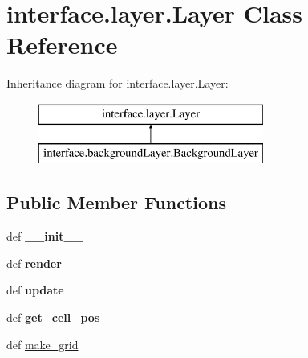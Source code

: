 \hypertarget{classinterface_1_1layer_1_1_layer}{\section{interface.\-layer.\-Layer \-Class \-Reference}
\label{classinterface_1_1layer_1_1_layer}
}
\-Inheritance diagram for interface.\-layer.\-Layer\-:\begin{figure}[H]
\begin{center}
\leavevmode
\includegraphics[height=2.000000cm]{classinterface_1_1layer_1_1_layer}
\end{center}
\end{figure}
\subsection*{\-Public \-Member \-Functions}
\begin{DoxyCompactItemize}
\item 
\hypertarget{classinterface_1_1layer_1_1_layer_ab9b02ee5672b0222065ac7d8148b6c9c}{def {\bfseries \-\_\-\-\_\-init\-\_\-\-\_\-}}\label{classinterface_1_1layer_1_1_layer_ab9b02ee5672b0222065ac7d8148b6c9c}

\item 
\hypertarget{classinterface_1_1layer_1_1_layer_ae5bf1cf30133971912c978524741098e}{def {\bfseries render}}\label{classinterface_1_1layer_1_1_layer_ae5bf1cf30133971912c978524741098e}

\item 
\hypertarget{classinterface_1_1layer_1_1_layer_a6e98a961961ea7d430adac46d3c29719}{def {\bfseries update}}\label{classinterface_1_1layer_1_1_layer_a6e98a961961ea7d430adac46d3c29719}

\item 
\hypertarget{classinterface_1_1layer_1_1_layer_a5b1411d03b84e5b0d0a86a6c58eba3a5}{def {\bfseries get\-\_\-cell\-\_\-pos}}\label{classinterface_1_1layer_1_1_layer_a5b1411d03b84e5b0d0a86a6c58eba3a5}

\item 
def \hyperlink{classinterface_1_1layer_1_1_layer_a36c73749e127ff1d97ca205cd544c07d}{make\-\_\-grid}
\end{DoxyCompactItemize}
